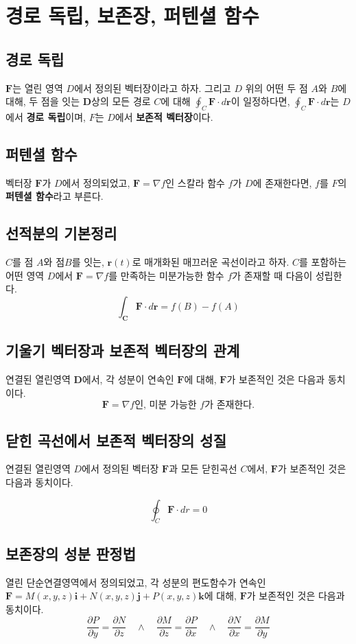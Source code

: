 \documentclass[chapter, oneside]{oblivoir}
\newcommand{\term}[1]{\textbf{#1}}
\begin{document}
\section{경로 독립, 보존장, 퍼텐셜 함수}
\subsection{경로 독립}
$\textbf{F}$는 열린 영역 $D$에서 정의된 벡터장이라고 하자. 그리고 $D$ 위의 어떤 두 점 $A$와 $B$에 대해, 두 점을 잇는 $\textbf{D}$상의 모든 경로 $C$에 대해 $\oint_C \textbf{F} \cdot d\textbf{r} $이 일정하다면, $\oint_C \textbf{F} \cdot d\textbf{r} $는 $D$에서 \term{경로 독립}이며, $F$는 $D$에서 \term{보존적 벡터장}이다.

\subsection{퍼텐셜 함수}
벡터장 $\textbf{F}$가 $D$에서 정의되었고, $\textbf{F} = \nabla f$인 스칼라 함수 $f$가 $D$에 존재한다면, $f$를 $F$의 \term{퍼텐셜 함수}라고 부른다.

\subsection{선적분의 기본정리 }

$C$를 점 $A$와 점$B$를 잇는, $\textbf{r}(t)$로 매개화된 매끄러운 곡선이라고 하자. $C$를 포함하는 어떤 영역 $D$에서 $\textbf{F} = \nabla f$를 만족하는 미분가능한 함수 $f$가 존재할 때 다음이 성립한다.
$$ \int_{\textbf{C}} \textbf{F} \cdot d\textbf{r} = f(B)-f(A)$$

\subsection{기울기 벡터장과 보존적 벡터장의 관계}
연결된 열린영역 $\textbf{D}$에서, 각 성분이 연속인 $\textbf{F}$에 대해, $\textbf{F}$가 보존적인 것은 다음과 동치이다.
$$\textbf{F} = \nabla f \text{인, 미분 가능한 }f\text{가 존재한다.}$$


\subsection{닫힌 곡선에서 보존적 벡터장의 성질}
연결된 열린영역 $D$에서 정의된 벡터장 $\textbf{F}$과 모든 닫힌곡선 $C$에서, $\textbf{F}$가 보존적인 것은 다음과 동치이다.

$$\oint_C \textbf{F} \cdot dr=0$$

\subsection{보존장의 성분 판정법 }
열린 단순연결영역에서 정의되었고, 각 성분의 편도함수가 연속인 $\textbf{F}=M(x,y,z)\textbf{i} + N(x,y,z)\textbf{j} +P(x,y,z)\textbf{k}$에 대해, $\textbf{F}$가 보존적인 것은 다음과 동치이다.
$$ \frac{\partial P}{\partial y}=\frac{\partial N}{\partial z} \quad \land \quad \frac{\partial M}{\partial z}=\frac{\partial P}{\partial x} \quad \land \quad \frac{\partial N}{\partial x}=\frac{\partial M}{\partial y} $$
\end{document}

